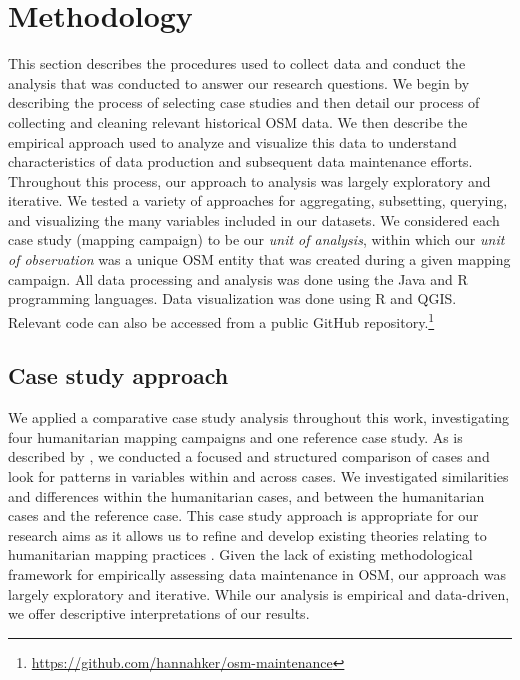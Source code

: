 \chapter{Methodology}
\label{chapterlabel4}

This section describes the procedures used to collect data and conduct the analysis that was conducted to answer our research questions. We begin by describing the process of selecting case studies and then detail our process of collecting and cleaning relevant historical OSM data. We then describe the empirical approach used to analyze and visualize this data to understand characteristics of data production and subsequent data maintenance efforts. Throughout this process, our approach to analysis was largely exploratory and iterative. We tested a variety of approaches for aggregating, subsetting, querying, and visualizing the many variables included in our datasets. We considered each case study (mapping campaign) to be our \textit{unit of analysis}, within which our \textit{unit of observation} was a unique OSM entity that was created during a given mapping campaign. All data processing and analysis was done using the Java and R programming languages. Data visualization was done using R and QGIS. Relevant code can also be accessed from a public GitHub repository.\footnote{\url{https://github.com/hannahker/osm-maintenance}} 

\section{Case study approach}

We applied a comparative case study analysis throughout this work, investigating four humanitarian mapping campaigns and one reference case study. As is described by \textcite{kaarbo_practical_1999}, we conducted a focused and structured comparison of cases and look for patterns in variables within and across cases. We investigated similarities and differences within the humanitarian cases, and between the humanitarian cases and the reference case. This case study approach is appropriate for our research aims as it allows us to refine and develop existing theories relating to humanitarian mapping practices \parencite{kaarbo_practical_1999}. Given the lack of existing methodological framework for empirically assessing data maintenance in OSM, our approach was largely exploratory and iterative. While our analysis is empirical and data-driven, we offer descriptive interpretations of our results.

